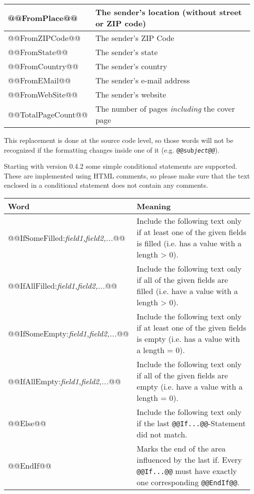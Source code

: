 \documentclass[a4paper,10pt]{scrartcl}
\begin{document}
\begin{center}
\begin{tabular}{|l|p{}|}
\ttfamily @@FromPlace@@ & The sender's  location (without street or ZIP code)\\\hline
\ttfamily @@FromZIPCode@@ & The sender's  ZIP Code \\\hline
\ttfamily @@FromState@@ & The sender's  state\\\hline
\ttfamily @@FromCountry@@ & The sender's  country\\\hline
\ttfamily @@FromEMail@@ & The sender's  e-mail address\\\hline
\ttfamily @@FromWebSite@@ & The sender's website\\\hline
\ttfamily @@TotalPageCount@@ & The number of pages \textit{including} the cover page \\\hline
\end{tabular}
\end{center}

This replacement is done at the source code level, so those words will not be recognized if the formatting changes inside one of it (e.g. \texttt{@@sub\textit{ject@@}}).

Starting with version 0.4.2 some simple conditional statements are supported. These are implemented using HTML comments, so please make sure that the text enclosed in a conditional statement does not contain any comments.
\begin{center}
\begin{tabular}{|l|p{}|}
\hline
\bfseries Word & \bfseries Meaning \\
\hline\hline
\ttfamily @@IfSomeFilled:\textit{field1,field2,...}@@ & Include the following text only if at least one of the given fields is filled (i.e. has a value with a length > 0).\\\hline
\ttfamily @@IfAllFilled:\textit{field1,field2,...}@@ & Include the following text only if all of the given fields are filled (i.e. have a value with a length > 0).\\\hline
\ttfamily @@IfSomeEmpty:\textit{field1,field2,...}@@ & Include the following text only if at least one of the given fields is empty (i.e. has a value with a length = 0).\\\hline
\ttfamily @@IfAllEmpty:\textit{field1,field2,...}@@ & Include the following text only if all of the given fields are empty (i.e. have a value with a length = 0).\\\hline
\ttfamily @@Else@@ & Include the following text only if the last \texttt{@@If...@@}-Statement did not match.\\\hline
\ttfamily @@EndIf@@ & Marks the end of the area influenced by the last if. Every \texttt{@@If...@@} must have exactly one corresponding \texttt{@@EndIf@@}.\\\hline
\end{tabular}
\end{center}
\end{document}
